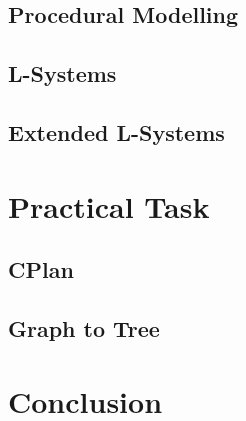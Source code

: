 \documentclass[11pt, a4paper]{report}
\begin{document}
\section{Procedural Modelling}

\section{L-Systems}

\section{Extended L-Systems}


\chapter{Practical Task}

\section{CPlan}

\section{Graph to Tree}


\chapter{Conclusion}


\appendix
\glsaddall
\printglossaries
\end{document}
